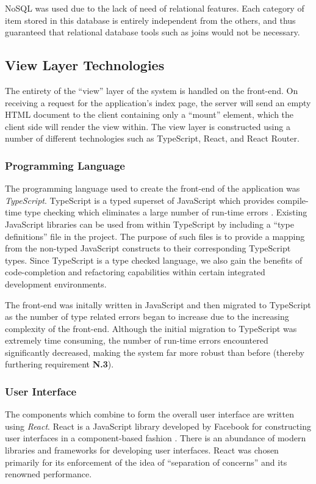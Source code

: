 \documentclass{l4proj}
\begin{document}
         NoSQL was used due to the lack of need of relational features. Each category of item stored in this database is entirely independent from the others, and thus guaranteed that relational database tools such as joins would not be necessary.

    \subsection{View Layer Technologies}
    
    The entirety of the ``view'' layer of the system is handled on the front-end. On receiving a request for the application's index page, the server will send an empty HTML document to the client containing only a ``mount'' element, which the client side will render the view within. The view layer is constructed using a number of different technologies such as TypeScript, React, and React Router.
    
    \subsubsection{Programming Language}
        The programming language used to create the front-end of the application was \textit{TypeScript}. TypeScript is a typed superset of JavaScript which provides compile-time type checking which eliminates a large number of run-time errors \cite{typescript}. Existing JavaScript libraries can be used from within TypeScript by including a ``type definitions'' file in the project. The purpose of such files is to provide a mapping from the non-typed JavaScript constructs to their corresponding TypeScript types. Since TypeScript is a type checked language, we also gain the benefits of code-completion and refactoring capabilities within certain integrated development environments.
        
        The front-end was initally written in JavaScript and then migrated to TypeScript as the number of type related errors began to increase due to the increasing complexity of the front-end. Although the initial migration to TypeScript was extremely time consuming, the number of run-time errors encountered significantly decreased, making the system far more robust than before (thereby furthering requirement \textbf{N.3}).
    
        \subsubsection{User Interface}
        The components which combine to form the overall user interface are written using \textit{React}. React is a JavaScript library developed by Facebook for constructing user interfaces in a component-based fashion \cite{react}. There is an abundance of modern libraries and frameworks for developing user interfaces. React was chosen primarily for its enforcement of the idea of ``separation of concerns'' and its renowned performance.
        
\end{document}
